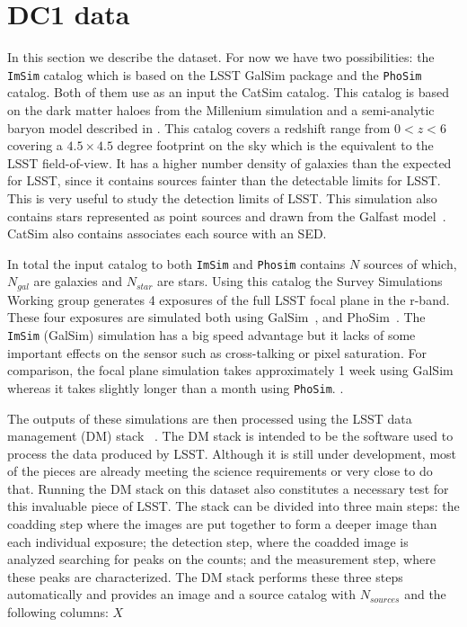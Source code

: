 \documentclass[\docopts]{\docclass}
\begin{document}

\section{DC1 data}
\label{sec:data}
In this section we describe the dataset. For now we have two possibilities: the \texttt{ImSim} catalog which is based on the LSST GalSim package and the \texttt{PhoSim} catalog. Both of them use as an input the CatSim catalog. This catalog is based on the dark matter haloes from the Millenium simulation and a semi-analytic baryon model described in \citep{2006MNRAS.366..499D}. This catalog covers a redshift range from $0 < z < 6$ covering a $4.5 \times 4.5$ degree footprint on the sky which is the equivalent to the LSST field-of-view. It has a higher number density of galaxies than the expected for LSST, since it contains sources fainter than the detectable limits for LSST. This is very useful to study the detection limits of LSST. This simulation also contains stars represented as point sources and drawn from the Galfast model~\citep{2008ApJ...673..864J}. CatSim also contains associates each source with an SED.

In total the input catalog to both \texttt{ImSim} and \texttt{Phosim} contains $N$ sources of which, $N_{gal}$ are galaxies and $N_{star}$ are stars. Using this catalog the Survey Simulations Working group generates 4 exposures of the full LSST focal plane in the r-band. These four exposures are simulated both using GalSim~\citep{2015A&C....10..121R}, and PhoSim~\citep{2015ApJS..218...14P}. The \texttt{ImSim} (GalSim) simulation has a big speed advantage but it lacks of some important effects on the sensor such as cross-talking or pixel saturation. For comparison, the focal plane simulation takes approximately 1 week using GalSim whereas it takes slightly longer than a month using \texttt{PhoSim}. .

The outputs of these simulations are then processed using the LSST data management (DM) stack~\citep{Overview,ScienceBook,WhitePaper}  . The DM stack is intended to be the software used to process the data produced by LSST. Although it is still under development, most of the pieces are already meeting the science requirements or very close to do that. Running the DM stack on this dataset also constitutes a necessary test for this invaluable piece of LSST. The stack can be divided into three main steps: the coadding step where the images are put together to form a deeper image than each individual exposure; the detection step, where the coadded image is analyzed searching for peaks on the counts; and the measurement step, where these peaks are characterized. The DM stack performs these three steps automatically and provides an image and a source catalog with $N_{sources}$ and the following columns: $X$  
\end{document}
